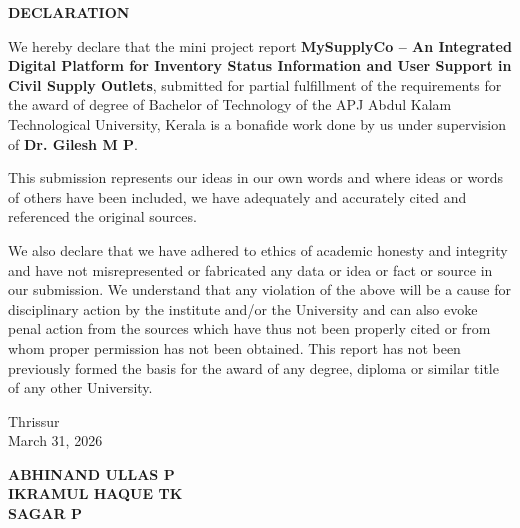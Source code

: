 \thispagestyle{empty}
\begin{center}
{\LARGE \textbf{DECLARATION}}
\end{center}

\vspace{1.5cm}

We hereby declare that the mini project report \textbf{MySupplyCo -- An Integrated Digital Platform for Inventory Status Information and User Support in Civil Supply Outlets}, submitted for partial fulfillment of the requirements for the award of degree of Bachelor of Technology of the APJ Abdul Kalam Technological University, Kerala is a bonafide work done by us under supervision of \textbf{Dr. Gilesh M P}.

\vspace{0.8cm}

This submission represents our ideas in our own words and where ideas or words of others have been included, we have adequately and accurately cited and referenced the original sources.

\vspace{0.5cm}

We also declare that we have adhered to ethics of academic honesty and integrity and have not misrepresented or fabricated any data or idea or fact or source in our submission. We understand that any violation of the above will be a cause for disciplinary action by the institute and/or the University and can also evoke penal action from the sources which have thus not been properly cited or from whom proper permission has not been obtained. This report has not been previously formed the basis for the award of any degree, diploma or similar title of any other University.

\vspace{2.5cm}

\noindent
\begin{minipage}[t]{0.45\textwidth}
Thrissur\\
March 31, 2026
\end{minipage}
\hfill
\begin{minipage}[t]{0.45\textwidth}
\raggedleft
\textbf{ABHINAND ULLAS P}\\[12pt]
\textbf{IKRAMUL HAQUE TK}\\[12pt]
\textbf{SAGAR P}
\end{minipage}
